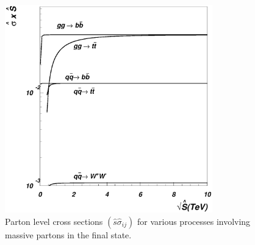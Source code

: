 \documentclass[12pt]{iopart}
\begin{document}
\begin{figure}[t]
\begin{center}
\includegraphics[width=9cm]{sigmah.eps}
\end{center}
\vspace*{-0.5cm}
\caption{
Parton level cross sections
$\left(\hat{s}\hat{\sigma}_{ij}\right)$
for various processes involving massive partons in the final state. 
} 
\label{fig:sigmah}
\end{figure}

%
%
\end{document}
